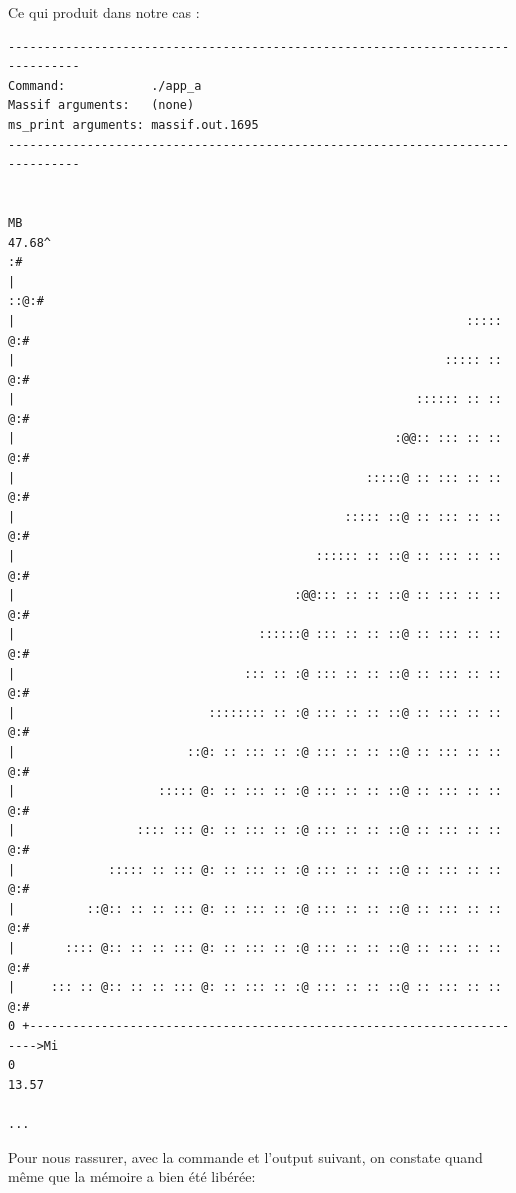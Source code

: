 Ce qui produit dans notre cas :
\begin{lstlisting}
--------------------------------------------------------------------------------
Command:            ./app_a
Massif arguments:   (none)
ms_print arguments: massif.out.1695
--------------------------------------------------------------------------------


MB
47.68^                                                                      :#
|                                                                   ::@:#
|                                                               ::::: @:#
|                                                            ::::: :: @:#
|                                                        :::::: :: :: @:#
|                                                     :@@:: ::: :: :: @:#
|                                                 :::::@ :: ::: :: :: @:#
|                                              ::::: ::@ :: ::: :: :: @:#
|                                          :::::: :: ::@ :: ::: :: :: @:#
|                                       :@@::: :: :: ::@ :: ::: :: :: @:#
|                                  ::::::@ ::: :: :: ::@ :: ::: :: :: @:#
|                                ::: :: :@ ::: :: :: ::@ :: ::: :: :: @:#
|                           :::::::: :: :@ ::: :: :: ::@ :: ::: :: :: @:#
|                        ::@: :: ::: :: :@ ::: :: :: ::@ :: ::: :: :: @:#
|                    ::::: @: :: ::: :: :@ ::: :: :: ::@ :: ::: :: :: @:#
|                 :::: ::: @: :: ::: :: :@ ::: :: :: ::@ :: ::: :: :: @:#
|             ::::: :: ::: @: :: ::: :: :@ ::: :: :: ::@ :: ::: :: :: @:#
|          ::@:: :: :: ::: @: :: ::: :: :@ ::: :: :: ::@ :: ::: :: :: @:#
|       :::: @:: :: :: ::: @: :: ::: :: :@ ::: :: :: ::@ :: ::: :: :: @:#
|     ::: :: @:: :: :: ::: @: :: ::: :: :@ ::: :: :: ::@ :: ::: :: :: @:#
0 +----------------------------------------------------------------------->Mi
0                                                                   13.57

...
\end{lstlisting}
Pour nous rassurer, avec la commande et l'output suivant, on constate quand même que la mémoire a bien été libérée:

